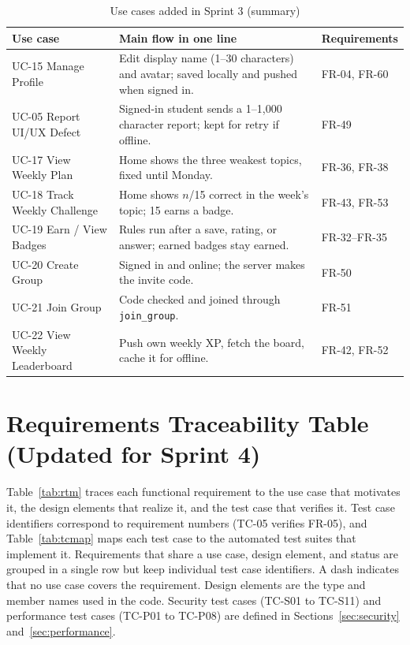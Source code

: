 \documentclass[12pt,letterpaper]{article}
\begin{document}
\begin{table}[H]
\centering
\caption{Use cases added in Sprint 3 (summary)}
\label{tab:ucnew}
\begin{tabularx}{\textwidth}{@{}L{3.6cm} Y L{2.0cm}@{}}
\toprule
\textbf{Use case} & \textbf{Main flow in one line} & \textbf{Requirements} \\
\midrule
UC-15 Manage Profile & Edit display name (1--30 characters) and avatar; saved locally and pushed when signed in. & FR-04, FR-60 \\
UC-05 Report UI/UX Defect & Signed-in student sends a 1--1,000 character report; kept for retry if offline. & FR-49 \\
UC-17 View Weekly Plan & Home shows the three weakest topics, fixed until Monday. & FR-36, FR-38 \\
UC-18 Track Weekly Challenge & Home shows $n$/15 correct in the week's topic; 15 earns a badge. & FR-43, FR-53 \\
UC-19 Earn / View Badges & Rules run after a save, rating, or answer; earned badges stay earned. & FR-32--FR-35 \\
UC-20 Create Group & Signed in and online; the server makes the invite code. & FR-50 \\
UC-21 Join Group & Code checked and joined through \texttt{join\_group}. & FR-51 \\
UC-22 View Weekly Leaderboard & Push own weekly XP, fetch the board, cache it for offline. & FR-42, FR-52 \\
\bottomrule
\end{tabularx}
\end{table}

\section{Requirements Traceability Table (Updated for Sprint 4)}\label{sec:trace}

Table~\ref{tab:rtm} traces each functional requirement to the use case that motivates
it, the design elements that realize it, and the test case that verifies it. Test case
identifiers correspond to requirement numbers (TC-05 verifies FR-05), and
Table~\ref{tab:tcmap} maps each test case to the automated test suites that implement
it. Requirements that share a use case, design element, and status are grouped in a
single row but keep individual test case identifiers. A dash indicates that no use case
covers the requirement. Design elements are the type and member names used in the code.
Security test cases (TC-S01 to TC-S11) and performance test cases (TC-P01 to TC-P08)
are defined in Sections~\ref{sec:security} and~\ref{sec:performance}.
\end{document}
